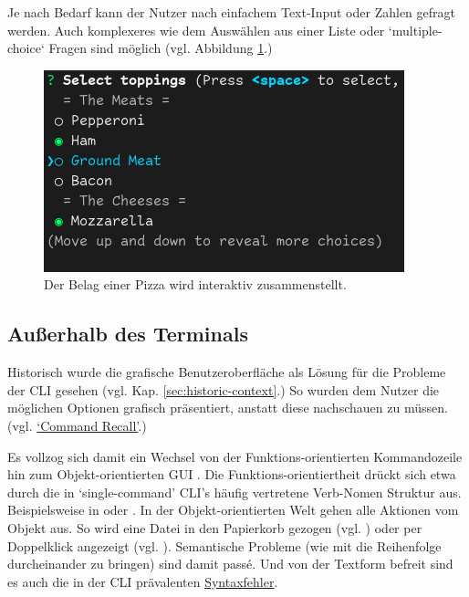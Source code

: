 \documentclass[oneside,bibliography=totocnumbered,BCOR=5mm]{scrbook}
\begin{document}
\smallskip

Je nach Bedarf kann der Nutzer nach einfachem Text-Input oder Zahlen
gefragt werden. Auch komplexeres wie dem Auswählen aus einer Liste oder
`multiple-choice` Fragen sind möglich (vgl. Abbildung \ref{fig:interactive-example2}.)

\begin{figure}[H]
  \centering
  \includegraphics[scale=0.5]{interactive-example2.png}
  \caption{Der Belag einer Pizza wird interaktiv zusammenstellt.}
  \label{fig:interactive-example2}
\end{figure}

\subsection{Außerhalb des Terminals}
\label{sec:weiterentwicklung-ausser}

Historisch wurde die grafische Benutzeroberfläche als Lösung für die Probleme
der CLI gesehen (vgl. Kap. \ref{sec:historic-context}.) So wurden dem Nutzer die
möglichen Optionen grafisch präsentiert, anstatt diese nachschauen zu müssen.
(vgl. \hyperref[prob:cr]{`Command Recall'}.)

\smallskip

Es vollzog sich damit ein Wechsel von der Funktions-orientierten
Kommandozeile hin zum Objekt-orientierten GUI \parencite{nielson1993}. Die
Funktions-orientiertheit drückt sich etwa durch die in `single-command' CLI's
häufig vertretene Verb-Nomen Struktur aus. Beispielsweise in  oder . In der Objekt-orientierten Welt gehen alle
Aktionen vom Objekt aus. So wird eine Datei in den Papierkorb gezogen (vgl.
) oder per Doppelklick angezeigt (vgl. ). Semantische Probleme (wie mit  die Reihenfolge
durcheinander zu bringen) sind damit passé. Und von der Textform befreit sind es
auch die in der CLI prävalenten \hyperref[prob:ss]{Syntaxfehler}.
\end{document}
